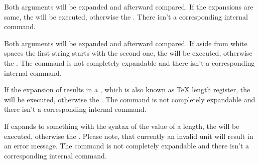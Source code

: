 \begin{Declaration}
\end{Declaration}
%
Both  arguments will be expanded and afterward compared. If the
expansions are same, the  will be executed, otherwise
the . There isn't a corresponding internal command.
%
%

\begin{Declaration}
\end{Declaration}
%
Both  arguments will be
expanded and afterward compared. If aside from white spaces the first string
starts with the second one, the  will be executed,
otherwise the . The command is not completely
expandable and there isn't a corresponding internal command.%
%

\begin{Declaration}
\end{Declaration}
%
If the expansion of results in
a , which is also known as \TeX{} length register, the
 will be executed, otherwise the . The command is not completely expandable and there isn't a
corresponding internal command.%
%

\begin{Declaration}
\end{Declaration}
%
If  expands to something with
the syntax of the value of a length, the  will be
executed, otherwise the . Please
note, that currently an invalid unit will result in an
error message. The command is not completely expandable and there isn't a
corresponding internal command.%
%

